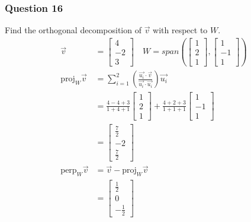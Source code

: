 \documentclass{math}
\begin{document}
\subsubsection*{Question 16}
Find the orthogonal decomposition of \( \vec{v} \) with respect to \( W \).
\begin{align*}
  \vec{v} &= \begin{bmatrix}4 \\ -2 \\ 3\end{bmatrix} \quad
    W = span\left(
      \begin{bmatrix}1 \\ 2 \\ 1\end{bmatrix},
      \begin{bmatrix}1 \\ -1 \\ 1\end{bmatrix}
    \right) \\
  \text{proj}_{W}\vec{v} &= \sum_{i=1}^{2}
    \left(\frac{\vec{u_i}\cdot\vec{v}}{\vec{u_i}\cdot\vec{u_i}}\right)
    \vec{u_i} \\
  &= \frac{4-4+3}{1+4+1}\begin{bmatrix}1 \\ 2 \\ 1\end{bmatrix}+
    \frac{4+2+3}{1+1+1}\begin{bmatrix}1 \\ -1 \\ 1\end{bmatrix} \\
  &= \begin{bmatrix}\frac{7}{2} \\ -2 \\ \frac{7}{2}\end{bmatrix} \\
  \text{perp}_{W}\vec{v} &= \vec{v}-\text{proj}_{W}\vec{v} \\
  &= \begin{bmatrix}\frac{1}{2} \\ 0 \\ -\frac{1}{2}\end{bmatrix}
\end{align*}
\end{document}
